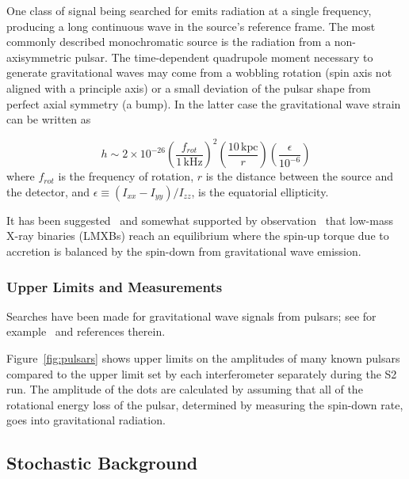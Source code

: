One class of signal being searched for emits radiation at a single frequency,
producing a long continuous wave in the source's reference frame. 
The most commonly described
monochromatic  source is the radiation from a non-axisymmetric pulsar.
The time-dependent quadrupole moment necessary to generate gravitational waves
may come from a wobbling rotation (spin axis not aligned with a principle axis)
or a small deviation of the pulsar shape from perfect axial symmetry (a bump).
In the latter case the gravitational wave strain can be written as~\cite{Kip:300}

\begin{equation}
h \sim 2 \times 10^{-26} \left(\frac{f_{rot}}{1 \, \mbox{kHz}} \right)^2
             \left(\frac{10 \, \mbox{kpc}}{r} \right)
             \left(\frac{\epsilon}{10^{-6}} \right)
\end{equation}
where $f_{rot}$ is the frequency of rotation, $r$ is the
distance between the source and the detector, and 
$\epsilon \equiv (I_{xx}-I_{yy})/I_{zz}$, is the equatorial ellipticity.


It has been suggested~\cite{Bildsten:Braking} and somewhat supported by
observation~\cite{Deepto:Braking} that low-mass X-ray binaries (LMXBs) reach
an equilibrium where the spin-up torque due to accretion is balanced by the
spin-down from gravitational wave emission.



\subsubsection{Upper Limits and Measurements}

Searches have been made for gravitational wave signals from pulsars; see for 
example~\cite{Hereld:Thesis,Mike:Thesis,S1:Pulsar} and references therein.

Figure~\ref{fig:pulsars} shows upper limits on the amplitudes of many known
pulsars compared to the upper limit set by each interferometer separately during
the S2 run. The amplitude of the dots are calculated by assuming that all of the
rotational energy loss of the pulsar, determined by measuring the spin-down
rate, goes into gravitational radiation.





\subsection{Stochastic Background}

